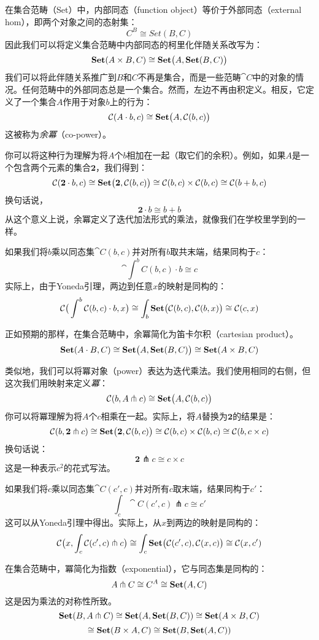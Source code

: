 \documentclass[DaoFP]{subfiles}
\begin{document}
 在集合范畴（Set）中，内部同态（function object）等价于外部同态（external hom），即两个对象之间的态射集：
 \[ C^B \cong Set(B, C) \]
 因此我们可以将定义集合范畴中内部同态的柯里化伴随关系改写为：
 \[ \mathbf{Set} (A \times B, C)  \cong \mathbf{Set} \big(A, \mathbf{Set} (B, C)\big) \]
 我们可以将此伴随关系推广到$B$和$C$不再是集合，而是一些范畴$\cat C$中的对象的情况。任何范畴中的外部同态总是一个集合。然而，左边不再由积定义。相反，它定义了一个集合$A$作用于对象$b$上的行为：
 \[ \mathcal{C} (A \cdot b, c) \cong \mathbf{Set} \big( A, \mathcal{C} (b, c)\big) \]
 这被称为\emph{余冪}（co-power）。

 你可以将这种行为理解为将$A$个$b$相加在一起（取它们的余积）。例如，如果$A$是一个包含两个元素的集合$\mathbf 2$，我们得到：
 \[ \mathcal{C} (\mathbf 2 \cdot b, c) \cong \mathbf{Set} \big( \mathbf 2, \mathcal{C} (b, c)\big) \cong \mathcal{C}(b, c) \times \mathcal{C}(b, c) \cong \mathcal{C}(b + b, c) \]
 换句话说，
 \[ \mathbf 2 \cdot b \cong b + b \]
 从这个意义上说，余冪定义了迭代加法形式的乘法，就像我们在学校里学到的一样。

 如果我们将$b$乘以同态集$\cat C (b, c)$并对所有$b$取共末端，结果同构于$c$：
 \[ \cat \int^b C(b, c) \cdot b \cong c \]
 实际上，由于Yoneda引理，两边到任意$x$的映射是同构的：
 \[ \mathcal{C} \big( \int^b \mathcal{C}(b, c) \cdot b, x\big) \cong \int_b \mathbf{Set} \big( \mathcal{C}(b, c), \mathcal{C} (b, x)\big) \cong \mathcal{C} (c, x)\]

 正如预期的那样，在集合范畴中，余冪简化为笛卡尔积（cartesian product）。
 \[ \mathbf{Set} (A \cdot B, C) \cong \mathbf{Set} \big( A, \mathbf{Set}(B, C)\big) \cong \mathbf{Set} (A \times B, C) \]

 类似地，我们可以将冪对象（power）表达为迭代乘法。我们使用相同的右侧，但这次我们用映射来定义\emph{冪}：
 \[ \mathcal{C} (b, A \pitchfork c) \cong \mathbf{Set}  \big(A, \mathcal{C}(b, c)\big) \]
 你可以将冪理解为将$A$个$c$相乘在一起。实际上，将$A$替换为$\mathbf 2$的结果是：
 \[ \mathcal{C} (b, \mathbf 2 \pitchfork c) \cong \mathbf{Set}  \big(\mathbf 2, \mathcal{C}(b, c)\big) \cong \mathcal{C}(b, c) \times \mathcal{C}(b, c) \cong \mathcal{C} (b, c \times c)\]
 换句话说：
 \[ \mathbf 2 \pitchfork c \cong c \times c \]
 这是一种表示$c^2$的花式写法。

 如果我们将$c$乘以同态集$\cat C(c', c)$并对所有$c$取末端，结果同构于$c'$：
 \[ \int_c \cat C (c', c) \pitchfork c \cong c' \]
 这可以从Yoneda引理中得出。实际上，从$x$到两边的映射是同构的：
 \[ \mathcal{C} \big(x, \int_c \mathcal{C} (c', c) \pitchfork c\big) \cong \int_c \mathbf{Set} \big( \mathcal{C}(c', c), \mathcal{C}(x, c)\big)  \cong \mathcal{C} (x, c') \]

 在集合范畴中，冪简化为指数（exponential），它与同态集是同构的：
 \[ A \pitchfork C \cong C^A \cong \mathbf{Set} (A, C) \]
 这是因为乘法的对称性所致。
 \[ \mathbf{Set}(B, A \pitchfork C) \cong \mathbf{Set} (A, \mathbf{Set}(B, C)) \cong \mathbf{Set} (A \times B, C) \]
 \[ \cong \mathbf{Set} (B \times A, C) \cong \mathbf{Set} (B, \mathbf{Set} (A, C))\]
\end{document}
